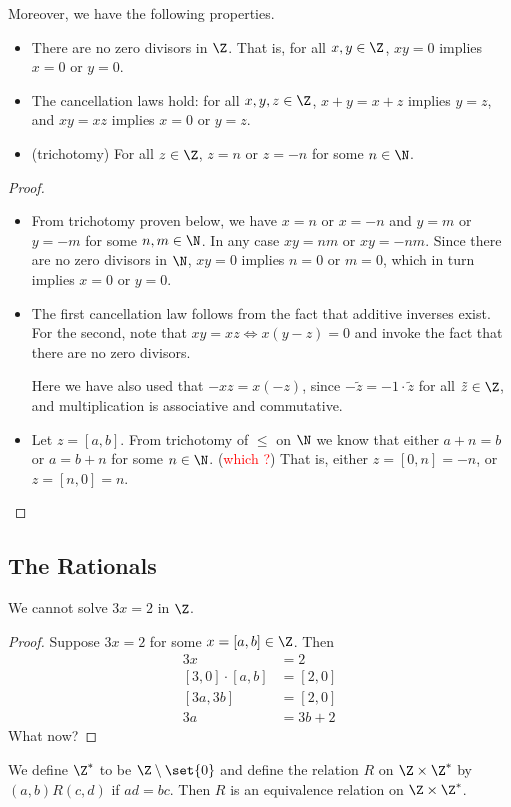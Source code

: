 Moreover, we have the following properties.
\begin{proposition} \label{thm:Z:prop} \leavevmode
    \begin{itemize}
        \item There are no zero divisors in $\Z$.
        That is, for all $x, y \in \Z$, $xy = 0$ implies $x = 0$ or $y = 0$.
        \item The cancellation laws hold:
        for all $x, y, z \in \Z$, $x + y = x + z$ implies $y = z$,
        and $xy = xz$ implies $x = 0$ or $y = z$.
        \item (trichotomy) For all $z \in \Z$, $z = n$ or $z = -n$ for some
        $n \in \N$.
    \end{itemize}
\end{proposition}
\begin{proof}
    \begin{itemize}
        \item From trichotomy proven below, we have $x = n$ or $x = -n$ and
        $y = m$ or $y = -m$ for some $n, m \in \N$.
        In any case $xy = nm$ or $xy = -nm$.
        Since there are no zero divisors in $\N$, $xy = 0$ implies $n = 0$ or
        $m = 0$, which in turn implies $x = 0$ or $y = 0$.
        \item The first cancellation law follows from the fact that additive
        inverses exist.
        For the second, note that $xy = xz \iff x(y - z) = 0$ and invoke the
        fact that there are no zero divisors.

        Here we have also used that $-xz = x(-z)$, since
        $-\tilde{z} = -1 \cdot \tilde{z}$ for all $\tilde{z} \in \Z$, and
        multiplication is associative and commutative.
        \item Let $z = [a, b]$.
        From trichotomy of $\le$ on $\N$ we know that either $a + n = b$ or
        $a = b + n$ for some $n \in \N$. (\textcolor{Red}{which \N?})
        That is, either $z = [0, n] = -n$, or $z = [n, 0] = n$.
    \end{itemize}
\end{proof}

\subsection{The Rationals} \label{sec:rationals}
We cannot solve $3x = 2$ in $\Z$.
\begin{proof}
    Suppose $3x = 2$ for some $x = [a, b] \in \Z$.
    Then \begin{align*}
        3x &= 2 \\
        [3, 0] \cdot [a, b] &= [2, 0] \\
        [3a, 3b] &= [2, 0] \\
        3a &= 3b + 2
    \end{align*}
    What now?
\end{proof}
We define $\Z^*$ to be $\Z \setminus \set{0}$ and define the relation $R$ on
$\Z \times \Z^*$ by $(a, b) R (c, d)$ if $ad = bc$.
Then $R$ is an equivalence relation on $\Z \times \Z^*$.

